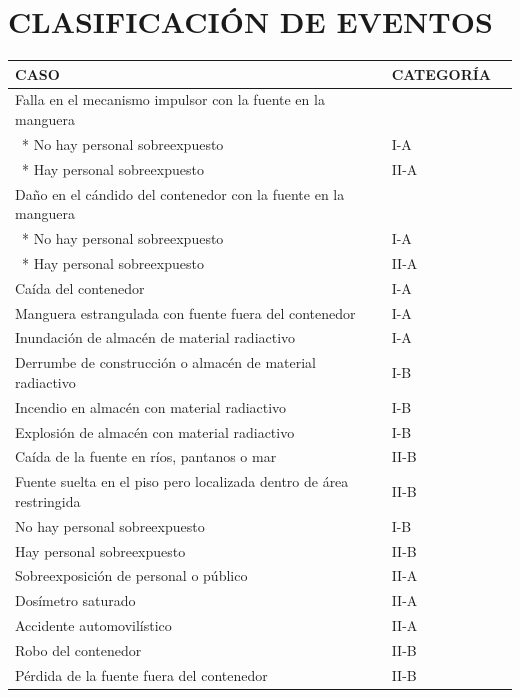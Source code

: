 \section*{CLASIFICACIÓN DE EVENTOS}

\begin{center}
\begin{tabular}{l | l | l}
\textbf{CASO} & \textbf{CATEGORÍA} \\
  \hline
Falla en el mecanismo impulsor con la fuente en la manguera & \\
\ * No hay personal sobreexpuesto &  I-A\\
\ * Hay personal sobreexpuesto & II-A \\
Daño en el cándido del contenedor con la fuente en la manguera & \\
\ * No hay personal sobreexpuesto & I-A\\
\ * Hay personal sobreexpuesto & II-A \\
Caída del contenedor & I-A \\
Manguera estrangulada con fuente fuera del contenedor & I-A \\
Inundación de almacén de material radiactivo & I-A \\
Derrumbe de construcción o almacén de material radiactivo & I-B \\
Incendio en almacén con material radiactivo & I-B \\
Explosión de almacén con material radiactivo & I-B \\
Caída de la fuente en ríos, pantanos o mar & II-B \\
Fuente suelta en el piso pero localizada dentro de área restringida & II-B \\
No hay personal sobreexpuesto & I-B \\
Hay personal sobreexpuesto & II-B \\
Sobreexposición de personal o público & II-A \\
Dosímetro saturado & II-A \\
Accidente automovilístico & II-A \\
Robo del contenedor & II-B \\
Pérdida de la fuente fuera del contenedor & II-B \\
\end{tabular}
\end{center}
